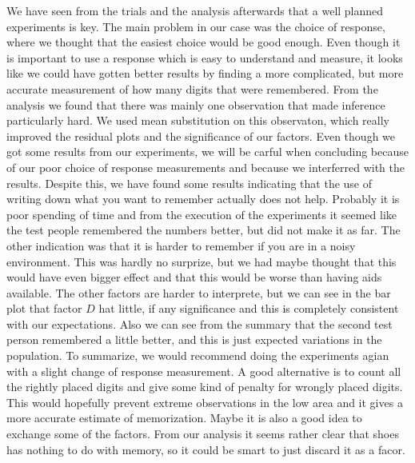 \documentclass[]{article}
\begin{document}
We have seen from the trials and the analysis afterwards that a well
planned experiments is key. The main problem in our case was the choice
of response, where we thought that the easiest choice would be good
enough. Even though it is important to use a response which is easy to
understand and measure, it looks like we could have gotten better
results by finding a more complicated, but more accurate measurement of
how many digits that were remembered. From the analysis we found that
there was mainly one observation that made inference particularly hard.
We used mean substitution on this observaton, which really improved the
residual plots and the significance of our factors. Even though we got
some results from our experiments, we will be carful when concluding
because of our poor choice of response measurements and because we
interferred with the results. Despite this, we have found some results
indicating that the use of writing down what you want to remember
actually does not help. Probably it is poor spending of time and from
the execution of the experiments it seemed like the test people
remembered the numbers better, but did not make it as far. The other
indication was that it is harder to remember if you are in a noisy
environment. This was hardly no surprize, but we had maybe thought that
this would have even bigger effect and that this would be worse than
having aids available. The other factors are harder to interprete, but
we can see in the bar plot that factor \(D\) hat little, if any
significance and this is completely consistent with our expectations.
Also we can see from the summary that the second test person remembered
a little better, and this is just expected variations in the population.
To summarize, we would recommend doing the experiments agian with a
slight change of response measurement. A good alternative is to count
all the rightly placed digits and give some kind of penalty for wrongly
placed digits. This would hopefully prevent extreme observations in the
low area and it gives a more accurate estimate of memorization. Maybe it
is also a good idea to exchange some of the factors. From our analysis
it seems rather clear that shoes has nothing to do with memory, so it
could be smart to just discard it as a facor.
\end{document}
